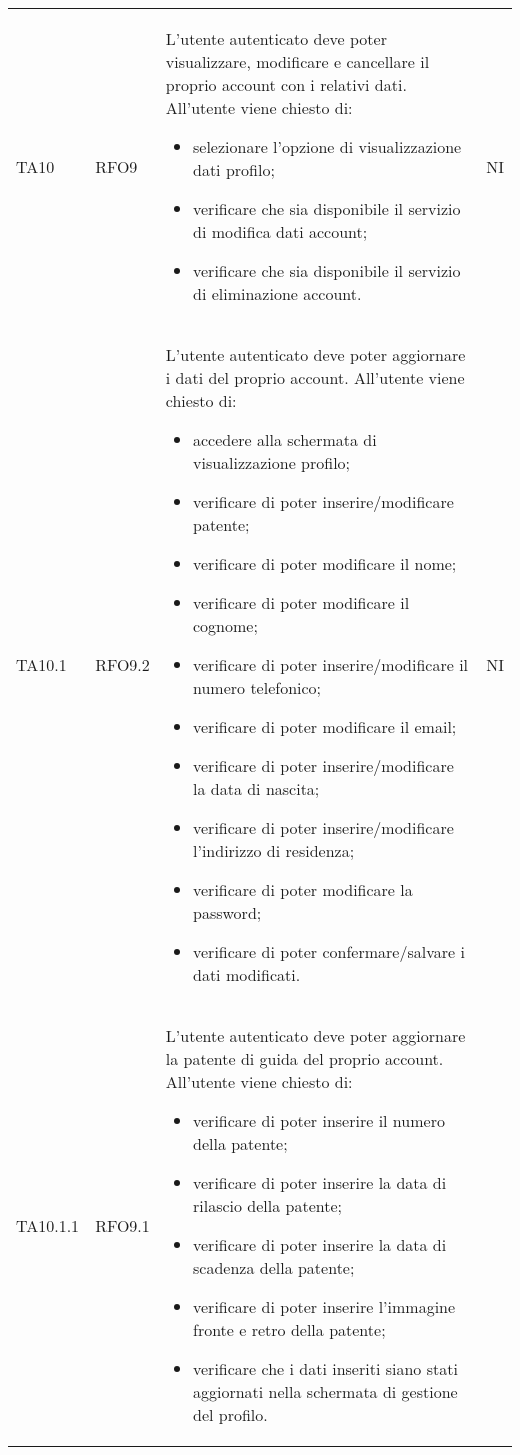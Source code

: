 \begin{longtable}{ >{\centering}p{} >{\centering}p{} >{\centering}p{}
			>{\centering}p{}}
		 TA10	& RFO9 & L'utente autenticato deve poter visualizzare, modificare e cancellare il proprio account con i relativi dati. All'utente viene chiesto di:
		 \begin{itemize}
		 	\item selezionare l'opzione di visualizzazione dati profilo;
		 	\item verificare che sia disponibile il servizio di modifica dati account;
		 	\item verificare che sia disponibile il servizio di eliminazione account.
		 \end{itemize}	&	NI	\tabularnewline
		 TA10.1 & RFO9.2 & L'utente autenticato deve poter aggiornare i dati del proprio account. All'utente viene chiesto di:
		 \begin{itemize}
		 	\item accedere alla schermata di visualizzazione profilo;
		 	\item verificare di poter inserire/modificare patente;
		 	\item verificare di poter modificare il nome;
		 	\item verificare di poter modificare il cognome;
		 	\item verificare di poter inserire/modificare il numero telefonico;
		 	\item verificare di poter modificare il email;
		 	\item verificare di poter inserire/modificare la data di nascita;
		 	\item verificare di poter inserire/modificare l'indirizzo di residenza;
		 	\item verificare di poter modificare la password;
		 	\item verificare di poter confermare/salvare i dati modificati.
		 \end{itemize}	&	NI	\tabularnewline
		 TA10.1.1	& RFO9.1 & L'utente autenticato deve poter aggiornare la patente di guida del proprio account. All'utente viene chiesto di:
		 \begin{itemize}
		 	\item verificare di poter inserire il numero della patente;
		 	\item verificare di poter inserire la data di rilascio della patente;
		 	\item verificare di poter inserire la data di scadenza della patente;
		 	\item verificare di poter inserire l'immagine fronte e retro della patente;
		 	\item verificare che i dati inseriti siano stati aggiornati nella schermata di gestione del profilo.

\end{itemize}
\end{longtable}
